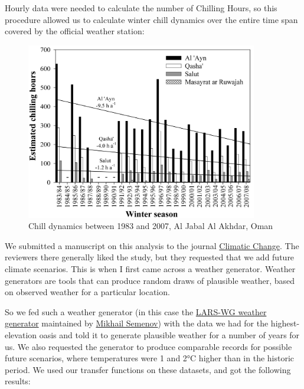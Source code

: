 \documentclass[
]{book}
\begin{document}
Hourly data were needed to calculate the number of Chilling Hours, so this procedure allowed us to calculate winter chill dynamics over the entire time span covered by the official weather station:

\begin{figure}
\centering
\includegraphics[width=0.9\textwidth,height=\textheight]{pictures/Luedeling_JPG_Figure_09_chilling_hours.JPG}
\caption{Chill dynamics between 1983 and 2007, Al Jabal Al Akhdar, Oman}
\end{figure}

We submitted a manuscript on this analysis to the journal \href{https://www.springer.com/journal/10584?gclid=EAIaIQobChMItKTqpKOF7AIVhZSyCh2taQD4EAAYASAAEgLRIfD_BwE}{Climatic Change}. The reviewers there generally liked the study, but they requested that we add future climate scenarios. This is when I first came across a weather generator. Weather generators are tools that can produce random draws of plausible weather, based on observed weather for a particular location.

So we fed such a weather generator (in this case the \href{https://sites.google.com/view/lars-wg/}{LARS-WG weather generator} maintained by \href{https://scholar.google.com/citations?user=FDj5OJMAAAAJ\&hl=en}{Mikhail Semenov}) with the data we had for the highest-elevation oasis and told it to generate plausible weather for a number of years for us. We also requested the generator to produce comparable records for possible future scenarios, where temperatures were 1 and 2°C higher than in the historic period. We used our transfer functions on these datasets, and got the following results:
\end{document}
